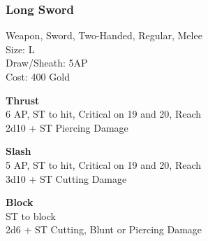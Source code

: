 \subsubsection{Long Sword}\label{weapon:longSword}
Weapon, Sword, Two-Handed, Regular, Melee\\
Size: L\\
Draw/Sheath: 5AP\\
Cost: 400 Gold

\textbf{Thrust}\\
6 AP, ST to hit, Critical on 19 and 20,  Reach\\
2d10 + \texttimes ST Piercing Damage

\textbf{Slash}\\
5 AP, ST to hit, Critical on 19 and 20,  Reach\\
3d10 + \texttimes ST Cutting Damage

\textbf{Block}\\
ST to block\\
2d6 + \texttimes ST Cutting, Blunt or Piercing Damage